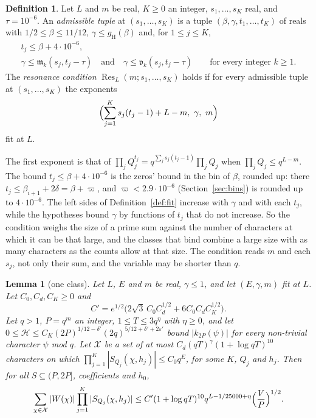 \documentclass[11pt]{article}
\newtheorem{lemma}[theorem]{Lemma}
\theoremstyle{definition}
\newtheorem{definition}[theorem]{Definition}
\begin{document}
\begin{definition}\label{def:res}
Let $L$ and $m$ be real, $K \ge 0$ an integer, $s_1, \dots, s_K$ real, and $\tau = 10^{-6}$. An \emph{admissible tuple}
at $(s_1, \dots, s_K)$ is a tuple $(\beta, \gamma, t_1, \dots, t_K)$ of reals with $1/2 \le \beta \le 11/12$, $\gamma
\le
g_{\mathrm H}(\beta)$ and, for $1 \le j \le K$,
\begin{gather*}
  t_j \le \beta + 4 \cdot 10^{-6}, \\
  \gamma \le \mathfrak m_k(s_j, t_j - \tau) \quad \text{and} \quad \gamma \le \mathfrak v_k(s_j, t_j - \tau) \qquad
  \text{for every integer } k \ge 1.
\end{gather*}
The \emph{resonance condition} $\operatorname{Res}_L(m; s_1, \dots, s_K)$ holds if for every admissible tuple at $(s_1,
\dots, s_K)$ the exponents
\[
  \Bigl(\sum_{j=1}^K s_j(t_j - 1) + L - m,\ \gamma,\ m\Bigr)
\]
fit at $L$.
\end{definition}

The first exponent is that of $\prod_j Q_j^{t_j} = q^{\sum_j s_j(t_j - 1)} \prod_j Q_j$ when $\prod_j Q_j \le q^{L -
m}$. The bound $t_j \le \beta + 4 \cdot 10^{-6}$ is the zeros' bound in the bin of $\beta$, rounded up: there $t_j \le
\beta_{i+1} + 2\delta = \beta + \varpi$, and $\varpi < 2.9 \cdot 10^{-6}$ (Section~\ref{sec:bins}) is rounded up
to $4 \cdot 10^{-6}$. The left sides of Definition~\ref{def:fit} increase with $\gamma$ and with each $t_j$, while
the hypotheses bound $\gamma$ by functions of $t_j$ that do not increase. So the condition weighs the size of a prime
sum against the number of characters at which
it can be that large, and the classes that bind combine a large size with as many characters as the counts allow at
that size. The condition reads $m$ and each $s_j$, not only their sum, and the variable may be shorter than $q$.

\begin{lemma}[one class]\label{lem:class}
Let $L$, $E$ and $m$ be real, $\gamma \le 1$, and let $(E, \gamma, m)$ fit at $L$. Let $C_0, C_d, C_K \ge 0$ and
\[
  C' = e^{1/2}\bigl(2\sqrt3\, C_0 C_d^{1/2} + 6 C_0 C_d C_K^{1/2}\bigr).
\]
Let $q > 1$, $P = q^m$ an integer, $1 \le T \le 3q^\eta$ with $\eta \ge 0$, and let $0 \le \mathcal H \le C_K (2P)^{1/12
-
\delta'} (2q)^{5/12 + \delta' + 2\varepsilon'}$ bound $|k_{2P}(\psi)|$ for every non-trivial character $\psi$ mod $q$.
Let $\mathcal X$ be a set of at most $C_d (qT)^\gamma (1 + \log qT)^{10}$ characters on which $\prod_{j=1}^K
|S_{Q_j}(\chi, h_j)| \le C_0 q^E$, for some $K$, $Q_j$ and $h_j$. Then for all $S \subseteq (P, 2P]$, coefficients and
$h_0$,
\[
  \sum_{\chi \in \mathcal X} |W(\chi)| \prod_{j=1}^K |S_{Q_j}(\chi, h_j)| \le C' (1 + \log qT)^{10} q^{L - 1/25000 +
  \eta} \Bigl(\frac VP\Bigr)^{1/2}.
\]
\end{lemma}
\end{document}
